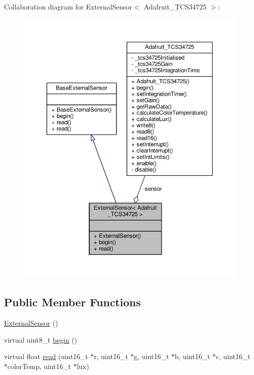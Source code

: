 Collaboration diagram for External\+Sensor$<$ Adafruit\+\_\+\+T\+C\+S34725 $>$\+:
\nopagebreak
\begin{figure}[H]
\begin{center}
\leavevmode
\includegraphics[width=350pt]{de/d19/class_external_sensor_3_01_adafruit___t_c_s34725_01_4__coll__graph}
\end{center}
\end{figure}
\subsection*{Public Member Functions}
\begin{DoxyCompactItemize}
\item 
\hyperlink{class_external_sensor_3_01_adafruit___t_c_s34725_01_4_a3b1855d165d295332b53e074344e3281}{External\+Sensor} ()
\item 
virtual uint8\+\_\+t \hyperlink{class_external_sensor_3_01_adafruit___t_c_s34725_01_4_ad9c1d1ac1f34ce1c153a0563d9cc55df}{begin} ()
\item 
virtual float \hyperlink{class_external_sensor_3_01_adafruit___t_c_s34725_01_4_a0d020129b78253b2929e33c0148631cd}{read} (uint16\+\_\+t $\ast$r, uint16\+\_\+t $\ast$g, uint16\+\_\+t $\ast$b, uint16\+\_\+t $\ast$c, uint16\+\_\+t $\ast$color\+Temp, uint16\+\_\+t $\ast$lux)
\end{DoxyCompactItemize}
